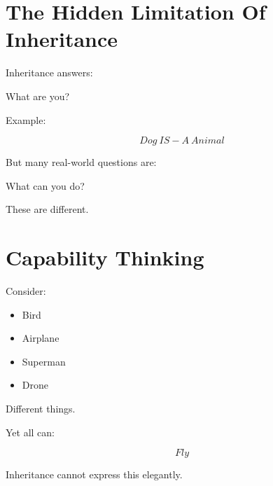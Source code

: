 \documentclass[11pt,a4paper]{book}
\begin{document}

\section{The Hidden Limitation Of Inheritance}

Inheritance answers:

\begin{center}
What are you?
\end{center}


Example:

\[
Dog\ IS\!-\!A\ Animal
\]


But many real-world questions are:

\begin{center}
What can you do?
\end{center}


These are different.


\section{Capability Thinking}

Consider:

\begin{itemize}
\item Bird
\item Airplane
\item Superman
\item Drone
\end{itemize}


Different things.


Yet all can:

\[
Fly
\]


Inheritance cannot express this elegantly.

\end{document}

